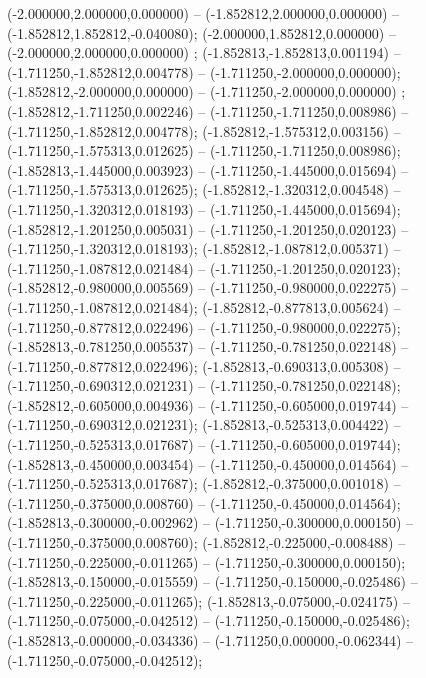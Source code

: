  (-2.000000,2.000000,0.000000) -- (-1.852812,2.000000,0.000000) -- (-1.852812,1.852812,-0.040080);
 (-2.000000,1.852812,0.000000) -- (-2.000000,2.000000,0.000000) ;
 (-1.852813,-1.852813,0.001194) -- (-1.711250,-1.852812,0.004778) -- (-1.711250,-2.000000,0.000000);
 (-1.852812,-2.000000,0.000000) -- (-1.711250,-2.000000,0.000000) ;
 (-1.852812,-1.711250,0.002246) -- (-1.711250,-1.711250,0.008986) -- (-1.711250,-1.852812,0.004778);
 (-1.852812,-1.575312,0.003156) -- (-1.711250,-1.575313,0.012625) -- (-1.711250,-1.711250,0.008986);
 (-1.852813,-1.445000,0.003923) -- (-1.711250,-1.445000,0.015694) -- (-1.711250,-1.575313,0.012625);
 (-1.852812,-1.320312,0.004548) -- (-1.711250,-1.320312,0.018193) -- (-1.711250,-1.445000,0.015694);
 (-1.852812,-1.201250,0.005031) -- (-1.711250,-1.201250,0.020123) -- (-1.711250,-1.320312,0.018193);
 (-1.852812,-1.087812,0.005371) -- (-1.711250,-1.087812,0.021484) -- (-1.711250,-1.201250,0.020123);
 (-1.852812,-0.980000,0.005569) -- (-1.711250,-0.980000,0.022275) -- (-1.711250,-1.087812,0.021484);
 (-1.852812,-0.877813,0.005624) -- (-1.711250,-0.877812,0.022496) -- (-1.711250,-0.980000,0.022275);
 (-1.852813,-0.781250,0.005537) -- (-1.711250,-0.781250,0.022148) -- (-1.711250,-0.877812,0.022496);
 (-1.852813,-0.690313,0.005308) -- (-1.711250,-0.690312,0.021231) -- (-1.711250,-0.781250,0.022148);
 (-1.852812,-0.605000,0.004936) -- (-1.711250,-0.605000,0.019744) -- (-1.711250,-0.690312,0.021231);
 (-1.852813,-0.525313,0.004422) -- (-1.711250,-0.525313,0.017687) -- (-1.711250,-0.605000,0.019744);
 (-1.852813,-0.450000,0.003454) -- (-1.711250,-0.450000,0.014564) -- (-1.711250,-0.525313,0.017687);
 (-1.852812,-0.375000,0.001018) -- (-1.711250,-0.375000,0.008760) -- (-1.711250,-0.450000,0.014564);
 (-1.852813,-0.300000,-0.002962) -- (-1.711250,-0.300000,0.000150) -- (-1.711250,-0.375000,0.008760);
 (-1.852812,-0.225000,-0.008488) -- (-1.711250,-0.225000,-0.011265) -- (-1.711250,-0.300000,0.000150);
 (-1.852813,-0.150000,-0.015559) -- (-1.711250,-0.150000,-0.025486) -- (-1.711250,-0.225000,-0.011265);
 (-1.852813,-0.075000,-0.024175) -- (-1.711250,-0.075000,-0.042512) -- (-1.711250,-0.150000,-0.025486);
 (-1.852813,-0.000000,-0.034336) -- (-1.711250,0.000000,-0.062344) -- (-1.711250,-0.075000,-0.042512);
